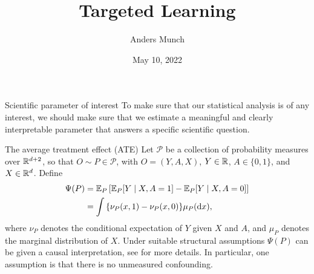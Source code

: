\documentclass[smaller]{beamer}\usepackage{listings}
\author{Anders Munch}
\date{May 10, 2022}
\title{Targeted Learning}
\begin{document}
\maketitle
\begin{frame}[label={sec:orgc6cac3e}]{Scientific parameter of interest}
\small To make sure that our statistical analysis is of any interest, we should make sure that we
estimate a meaningful and clearly interpretable parameter that answers a specific scientific
question.
\begin{exampleblock}{The average treatment effect (ATE)}
Let $\mathcal{P}$ be a collection of probability measures over $\mathbb{R}^{d+2}$, so that
$O \sim P \in \mathcal{P}$, with $O = (Y, A, X)$, $Y\in \mathbb{R}$, $A\in \{0,1\}$, and $X \in
\mathbb{R}^d$. Define
\begin{align*}
  \Psi(P)
  & = \operatorname{\mathbb{E}}_P{\left[ \operatorname{\mathbb{E}}_P[Y \mid X, A=1] - \operatorname{\mathbb{E}}_P[Y \mid X, A=0] \right]} \\
  & = \int {\left\{ \nu_P(x, 1) - \nu_P(x, 0) \right\}} \mu_P(\mathop{}\!\mathrm{d} x),
\end{align*}
where $\nu_P$ denotes the conditional expectation of $Y$ given $X$ and $A$, and $\mu_P$ denotes the
marginal distribution of $X$. 
Under suitable structural assumptions \(\Psi(P)\) can be given a causal interpretation, see
\citep{kennedy2016semiparametric,hernanRobinsWhatIf} for more details. In particular, one
assumption is that there is no unmeasured confounding.
\end{exampleblock}
\end{frame}
\end{document}
